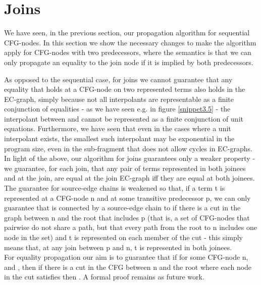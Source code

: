 \newpage
\section{Joins}\label{section:ugfole:joins}
We have seen, in the previous section, our propagation algorithm for sequential CFG-nodes.
In this section we show the necessary changes to make the algorithm apply for CFG-nodes with two predecessors, where the semantics is that we can only propagate an equality to the join node if it is implied by both predecessors.

As opposed to the sequential case, for joins we cannot guarantee that any equality that holds at a CFG-node on two represented terms also holds in the EC-graph, simply because not all interpolants are representable as a finite conjunction of equalities - as we have seen e.g. in figure \ref{snippet3.5} - the interpolant between  and  cannot be represented as a finite conjunction of unit equations. 
Furthermore, we have seen that even in the cases where a unit interpolant exists, the smallest such interpolant may be exponential in the program size, even in the sub-fragment that does not allow cycles in EC-graphs. In light of the above, our algorithm for joins guarantees only a weaker property - we guarantee, for each join, that any pair of terms represented in both joinees and at the join, are equal at the join EC-graph iff they are equal at both joinees. 
The guarantee for source-edge chains is weakened so that, if a term t is represented at a CFG-node n and at some transitive predecessor p, we can only guarantee that  is connected by a source-edge chain to  if there is a cut in the graph between n and the root that includes p (that is, a set of CFG-nodes that pairwise do not share a path, but that every path from the root to n includes one node in the set) and t is represented on each member of the cut - this simply means that, at any join between p and n, t is represented in both joinees.\\
For equality propagation our aim is to guarantee that if
 for some CFG-node n, and , then if there is a cut in the CFG between n and the root where each node  in the cut satisfies  then . A formal proof remains as future work.

